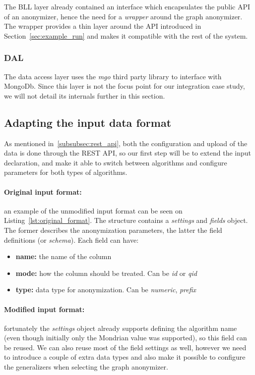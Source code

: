 The BLL layer already contained an interface which encapsulates the public API of an anonymizer, hence the need for a \emph{wrapper} around the graph anonymizer. The wrapper provides a thin layer around the API introduced in Section~\ref{sec:example_run} and makes it compatible with the rest of the system.

\subsubsection{DAL}
The data access layer uses the \emph{mgo} third party library to interface with MongoDb. Since this layer is not the focus point for our integration case study, we will not detail its internals further in this section.

\subsection{Adapting the input data format}\label{subsec:json_input_format}
As mentioned in~\ref{subsubsec:rest_api}, both the configuration and upload of the data is done through the REST API, so our first step will be to extend the input declaration, and make it able to switch between algorithms and configure parameters for both types of algorithms.

\paragraph{Original input format:} an example of the unmodified input format can be seen on Listing~\ref{lst:original_format}. The structure contains a \textit{settings} and \textit{fields} object. The former describes the anonymization parameters, the latter the field definitions (or \emph{schema}). Each field can have:
\begin{itemize}
    \item \textbf{name:} the name of the column
    \item \textbf{mode:} how the column should be treated. Can be \textit{id} or \textit{qid}
    \item \textbf{type:} data type for anonymization. Can be \textit{numeric}, \textit{prefix}
\end{itemize}

\vspace{\baselineskip}


\paragraph{Modified input format:} fortunately the \textit{settings} object already supports defining the algorithm name (even though initially only the Mondrian value was supported), so this field can be reused. We can also reuse most of the field settings as well, however we need to introduce a couple of extra data types and also make it possible to configure the generalizers when selecting the graph anonymizer.

